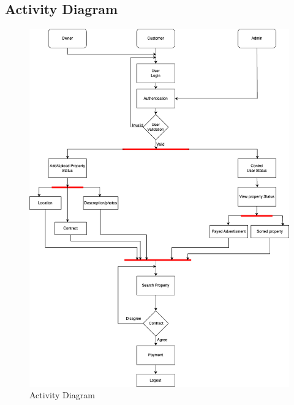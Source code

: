 \newpage
\subsection{Activity Diagram}
\begin{figure}[hbt!]
    \centering
    \includegraphics[width=140mm]{Activity.drawio.png}
    \caption{Activity Diagram}
    \label{fig:Activity Diagram }
\end{figure}

\newpage
